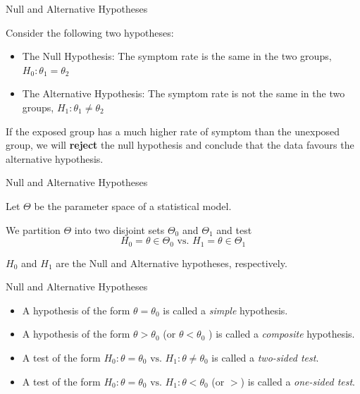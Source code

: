 \documentclass{beamer}
\begin{document}
\begin{frame}{Null and Alternative Hypotheses}

	Consider the following two hypotheses:
	\begin{itemize}
		\item The Null Hypothesis: The symptom rate is the same in the two groups, $H_0:\theta_1 = \theta_2$
		\item The Alternative Hypothesis: The symptom rate is not the same in the two groups, $H_1:\theta_1 \neq \theta_2$
	\end{itemize}

	\vskip 0.5cm

	If the exposed group has a much higher rate of symptom than the
	unexposed group, we will \textbf{reject} the null hypothesis and conclude that
	the data favours the alternative hypothesis.

\end{frame}

\begin{frame}{Null and Alternative Hypotheses}

	Let $\Theta$ be the parameter space of a statistical model. 

	We partition $\Theta$ into two disjoint  sets $\Theta_0$ and $\Theta_1$ and test
	\begin{equation*}
		H_0 = \theta \in \Theta_0 \text{ vs. } H_1 = \theta \in \Theta_1 
	\end{equation*}

	$H_0$ and $H_1$ are the Null and Alternative hypotheses, respectively.

\end{frame}

\begin{frame}{Null and Alternative Hypotheses}

	\begin{itemize}
		\item A hypothesis of the form $\theta = \theta_0$ is called a \textit{simple} hypothesis.
		\item A hypothesis of the form $\theta > \theta_0$ (or $\theta < \theta_0$ ) is called a \textit{composite} hypothesis.
	\end{itemize}

	\vskip 0.5cm

	\begin{itemize}
		\item A test of the form $H_0: \theta = \theta_0 \text{ vs. } H_1: \theta \neq \theta_0$ is called a
	\textit{two-sided test}.
		\item A test of the form $H_0: \theta = \theta_0 \text{ vs. } H_1:\theta < \theta_0$ (or $>$) is called a \textit{one-sided test}.
	\end{itemize}

\end{frame}
\end{document}
